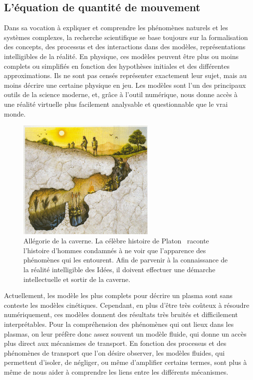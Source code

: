 \label{ApproximationsEqMvt}
\begin{refsection}
\section{L'équation de quantité de mouvement}

Dans sa vocation à expliquer et comprendre les phénomènes naturels et les
systèmes complexes, la recherche scientifique se base toujours sur la
formalisation des concepts, des processus et des interactions dans des
modèles, représentations intelligibles de la réalité. En physique, ces modèles
peuvent être plus ou moins complets ou simplifiés en fonction des hypothèses
initiales et des différentes approximations. Ils ne sont
pas censés représenter exactement leur sujet, mais au moins décrire une
certaine physique en jeu.
Les modèles sont l'un des
principaux outils de la science moderne, et, grâce à l'outil numérique, nous
donne accès à une réalité virtuelle plus facilement analysable et questionnable
que le vrai monde.

\begin{figure}[!htbp]
    \centering
	\includegraphics[width=0.6\textwidth]{figures/1-cave.jpg}
	\caption{Allégorie de la caverne. La célèbre histoire de
	Platon~\parencite{Platon} raconte l'histoire d'hommes condamnés à ne voir que
	l'apparence des phénomènes qui les entourent. Afin de parvenir à la connaissance de la réalité
	intelligible des Idées, il doivent effectuer une démarche intellectuelle
	et sortir de la caverne.}\label{caverne}
\end{figure}


Actuellement, les modèle les plus complets pour décrire un plasma sont sans
conteste les modèles cinétiques. Cependant, en plus d'être très coûteux à
résoudre numériquement, ces modèles donnent des résultats très bruités
et difficilement interprétables. Pour la compréhension des phénomènes qui ont
lieux dans les plasmas, on leur préfère donc assez souvent un modèle fluide, qui
donne un accès plus direct aux mécanismes de transport. En fonction des
processus et des phénomènes de transport que l'on désire observer, les modèles
fluides, qui permettent d'isoler, de négliger, ou même d'amplifier certains
termes, sont plus à même de nous aider à comprendre les liens entre les différents mécanismes.


\end{refsection}
